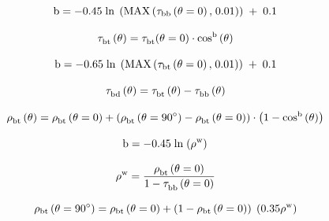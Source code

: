 \begin{equation}
{\rm{b}} =  - {\rm{0}}{\rm{.45}}\;{\rm{ln}}\;\left( {{\rm{MAX}}\left( {{{\rm{\tau }}_{{\rm{bb}}}}\left( {{\rm{\theta }} = {\rm{0}}} \right){\rm{,}}\;{\rm{0}}{\rm{.01}}} \right)} \right)\; + \;{\rm{0}}{\rm{.1}}
\end{equation}

\begin{equation}
{\rm{\tau }}_{{\rm{bt}}}^{}\left( {\rm{\theta }} \right) = {\rm{\tau }}_{{\rm{bt}}}^{}{\rm{(\theta }} = {\rm{0)}} \cdot {\rm{co}}{{\rm{s}}^{\rm{b}}}\left( {\rm{\theta }} \right)
\end{equation}

\begin{equation}
{\rm{b}} =  - {\rm{0}}{\rm{.65}}\;{\rm{ln}}\;\left( {{\rm{MAX}}\left( {{{\rm{\tau }}_{{\rm{bt}}}}\left( {{\rm{\theta }} = {\rm{0}}} \right){\rm{,}}\;{\rm{0}}{\rm{.01}}} \right)} \right)\; + \;{\rm{0}}{\rm{.1}}
\end{equation}

\begin{equation}
{\rm{\tau }}_{{\rm{bd}}}^{}\left( {\rm{\theta }} \right) = {\rm{\tau }}_{{\rm{bt}}}^{}\left( {\rm{\theta }} \right) - {\rm{\tau }}_{{\rm{bb}}}^{}\left( {\rm{\theta }} \right)
\end{equation}

\begin{equation}
{\rm{\rho }}_{{\rm{bt}}}^{}\left( {\rm{\theta }} \right) = {\rm{\rho }}_{{\rm{bt}}}^{}\left( {{\rm{\theta }} = {\rm{0}}} \right) + \left( {{\rm{\rho }}_{{\rm{bt}}}^{}\left( {{\rm{\theta }} = 9{\rm{0}}^\circ } \right) - {\rm{\rho }}_{{\rm{bt}}}^{}\left( {{\rm{\theta }} = {\rm{0}}} \right)} \right) \cdot \left( {1 - {\rm{co}}{{\rm{s}}^{\rm{b}}}\left( {\rm{\theta }} \right)} \right)
\end{equation}

\begin{equation}
{\rm{b}} =  - {\rm{0}}{\rm{.45}}\;{\rm{ln}}\;{\left( {{{\rm{\rho }}^{\rm{w}}}} \right)^{}}
\end{equation}

\begin{equation}
{\rm{\rho }}_{}^{\rm{w}} = \frac{{{\rm{\rho }}_{{\rm{bt}}}^{}\left( {{\rm{\theta }} = {\rm{0}}} \right)}}{{{\rm{1}} - {\rm{\tau }}_{{\rm{bb}}}^{}\left( {{\rm{\theta }} = {\rm{0}}} \right)}}
\end{equation}

\begin{equation}
{\rho_{{\rm{bt}}}}\left( {{\rm{\theta }} = {\rm{90}}^\circ } \right) = {\rho_{{\rm{bt}}}}\left( {{\rm{\theta }} = {\rm{0}}} \right) + \left( {1 - {\rho_{{\rm{bt}}}}\left( {{\rm{\theta }} = {\rm{0}}} \right)} \right)\;\left( {{\rm{0}}{\rm{.35}}{\rho ^{\rm{w}}}} \right)
\end{equation}

